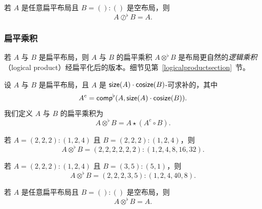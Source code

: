 \begin{example}
    若 $A$ 是任意扁平布局且 $B = ():() $ 是空布局，则
    \[
    A\oslash^\flat B =  A.
    \]
\end{example}

\subsubsection{扁平乘积}

若 $A$ 与 $B$ 是扁平布局，则 $A$ 与 $B$ 的扁平乘积 $A \otimes^\flat B$ 是布局更自然的{\it 逻辑乘积}（logical product）经扁平化后的版本。细节见第~\ref{logicalproductsection}~节。
\begin{definition}
    设 $A$ 与 $B$ 是扁平布局，且 $A$ 是 $\mathsf{size}(A) \cdot \mathsf{cosize}(B)$-可求补的，其中
    \[
    A^c = \mathsf{comp}^\flat(A,\mathsf{size}(A)\cdot \mathsf{cosize}(B)).
    \]
    我们定义 $A$ 与 $B$ 的扁平乘积为
    \[
    A \otimes^\flat B = A \star (A^c \circ B).
    \]
\end{definition}
\begin{example}
    若 $A = (2,2,2):(1,2,4)$ 且 $B = (2,2,2):(1,2,4)$，则
    \[
    A \otimes^\flat B = (2,2,2,2,2,2):(1,2,4,8,16,32).
    \]
\end{example}

\begin{example}
    若 $A = (2,2,2):(1,2,4)$ 且 $B = (3,5):(5,1)$，则
    \[
    A \otimes^\flat B = (2,2,2,3,5):(1,2,4,40,8).
    \]
\end{example}

\begin{example}
    若 $A$ 是任意扁平布局且 $B = ():()$ 是空布局，则
    \[
    A \otimes^\flat B = A.
    \]
\end{example}
